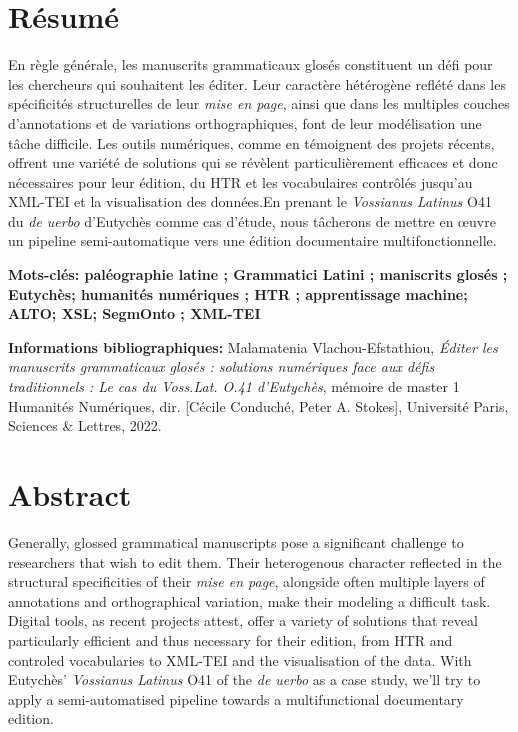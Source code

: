 \documentclass[a4paper, twoside, 12pt]{book}
\begin{document}
\section*{Résumé}
En règle générale, les manuscrits grammaticaux glosés constituent un défi pour les chercheurs qui souhaitent les éditer. Leur caractère hétérogène reflété dans les spécificités structurelles de leur \textit{mise en page}, ainsi que dans les multiples couches d'annotations et de variations orthographiques, font de leur modélisation une tâche difficile. Les outils numériques, comme en témoignent des projets récents, offrent une variété de solutions qui se révèlent particulièrement efficaces et donc nécessaires pour leur édition, du HTR et les vocabulaires contrôlés jusqu'au XML-TEI et la visualisation des données.En prenant le \textit{Vossianus Latinus} O41 du \textit{de uerbo} d'Eutychès comme cas d'étude, nous tâcherons de mettre en œuvre un pipeline semi-automatique vers une édition documentaire multifonctionnelle.

\medskip

\textbf{Mots-clés: paléographie latine ; Grammatici Latini ; maniscrits glosés ; Eutychès; humanités numériques ; HTR ; apprentissage machine; ALTO; XSL; SegmOnto ; XML-TEI }

\textbf{Informations bibliographiques:} Malamatenia Vlachou-Efstathiou, \textit{Éditer les manuscrits grammaticaux glosés : solutions numériques face aux défis traditionnels : Le cas du \textit{Voss.Lat. O.41} d'Eutychès}, mémoire de master 1 \og Humanités Numériques\fg{}, dir. [Cécile Conduché, Peter A. Stokes], Université Paris, Sciences \& Lettres, 2022.


\section*{Abstract}
Generally, glossed grammatical manuscripts pose a significant challenge to researchers that wish to edit them. Their heterogenous character reflected in the structural specificities of their \textit{mise en page}, alongside often multiple layers of annotations and orthographical variation, make their modeling a difficult task. Digital tools, as recent projects attest, offer a variety of solutions that reveal particularly efficient and thus necessary for their edition, from HTR and controled vocabularies to XML-TEI and the visualisation of the data. With Eutychès' \textit{Vossianus Latinus} O41 of the \textit{de uerbo} as a case study, we'll try to apply a semi-automatised pipeline towards a multifunctional documentary edition.
\end{document}

